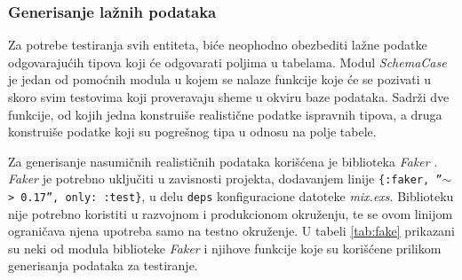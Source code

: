 \documentclass[12pt,oneside]{memoir}
\begin{document}
\subsubsection{Generisanje lažnih podataka}
\par Za potrebe testiranja svih entiteta, biće neophodno obezbediti lažne podatke odgovarajućih tipova koji će odgovarati poljima u tabelama. Modul \emph{SchemaCase} je jedan od pomoćnih modula u kojem se nalaze funkcije koje će se pozivati u skoro svim testovima koji proveravaju sheme u okviru baze podataka. Sadrži dve funkcije, od kojih jedna konstruiše realistične podatke ispravnih tipova, a druga konstruiše podatke koji su pogrešnog tipa u odnosu na polje tabele. 
\par Za generisanje nasumičnih realističnih podataka korišćena je biblioteka \emph{Faker} \cite{faker}. \emph{Faker} je potrebno uključiti u zavisnosti projekta, dodavanjem linije \texttt{\{:faker, ''$\sim$> 0.17'', only: :test\}}, u delu \texttt{deps} konfiguracione datoteke \emph{mix.exs}. Biblioteku nije potrebno koristiti u razvojnom i produkcionom okruženju, te se ovom linijom ograničava njena upotreba samo na testno okruženje. U tabeli \ref{tab:fake} prikazani su neki od modula biblioteke \emph{Faker} i njihove funkcije koje su korišćene prilikom generisanja podataka za testiranje.
\end{document}
